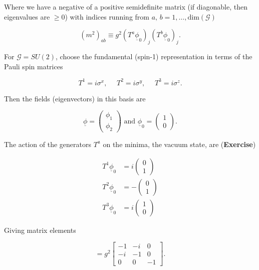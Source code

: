 \noindent Where we have a negative of a positive semidefinite matrix (if diagonable, then eigenvalues are $\ge 0$) with indices running from $a, \, b = 1, \dots, \text{dim}(\mathcal{G})$

\begin{equation}
(m^2)_{ab} \equiv g^2 (T^a \underline{\phi}_0 )_j (T^b \underline{\phi}_0)_j.
\end{equation}

\noindent For $\mathcal{G} = SU(2)$, choose the fundamental (spin-1) representation in terms of the Pauli spin matrices

\begin{equation}
T^1 = i \sigma^x, \,\,\,\,\,\,\,\, T^2 = i \sigma^y , \,\,\,\,\,\,\,\, T^3 = i \sigma^z.
\end{equation}

\noindent Then the fields (eigenvectors) in this basis are

\begin{equation}
\underline{\phi} = \begin{pmatrix} \phi_1 \\ \phi_2 \end{pmatrix} \text{ and } \underline{\phi}_0 = \begin{pmatrix} 1 \\ 0 \end{pmatrix}.
\end{equation}

\noindent The action of the generators $T^a$ on the minima, the vacuum state, are (\textbf{Exercise})

\begin{align}
T^1 \underline{\phi}_0 &= i \begin{pmatrix} 0 \\ 1 \end{pmatrix} \\
T^2 \underline{\phi}_0 &= - \begin{pmatrix} 0 \\ 1 \end{pmatrix} \\
T^3 \underline{\phi}_0 &= i \begin{pmatrix} 1 \\ 0 \end{pmatrix} 
\end{align}

\noindent Giving matrix elements

\begin{equation}
[m^2] = g^2
\begin{bmatrix}
 -1 & -i & 0 \\
 -i & -1 & 0 \\
  0 & 0 & -1
\end{bmatrix}.
\end{equation}


